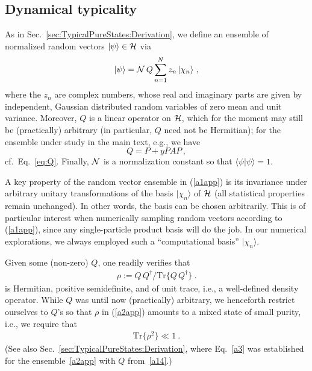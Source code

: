 \documentclass[twocolumn,aps,prb,floatfix,superscriptaddress]{revtex4-2}
\newcommand{\<}{\left\langle}	%
\renewcommand{\>}{\right\rangle}	%
\newcommand{\pu}{\tr\{\rho^2\}}
\newcommand{\tr}{\mbox{Tr}}
\newcommand{\hr}{{\cal H}}
\begin{document}
\subsection{Dynamical typicality}
\label{app111}

As 
in
Sec.~\ref{sec:TypicalPureStates:Derivation},
we define an ensemble of normalized 
random vectors $|\psi\rangle\in\hr$ via
\begin{eqnarray}
|\psi\rangle=
{\cal{N}}\, Q \sum_{n=1}^N z_n \, |\chi_n\rangle
\ ,
\label{a1app}
\end{eqnarray}
where the $z_n$ are complex numbers,
whose real and imaginary parts are 
given by independent, Gaussian distributed 
random variables of zero mean and 
unit variance.
Moreover, $Q$ is a linear operator on $\hr$,
which for the moment may still be 
(practically) arbitrary
(in particular, $Q$ need not be Hermitian);
for the ensemble under study in the main text,
e.g.,
we have
\begin{equation}
\label{a14}
	Q = P + y P A P \,,
\end{equation}
cf.\ Eq.~\eqref{eq:Q}.
Finally, ${\cal{N}}$ is a normalization 
constant so that 
$\langle\psi|\psi\rangle =1$.

A key property of the random vector ensemble 
in (\ref{a1app}) is its invariance under arbitrary 
unitary transformations of the basis 
$|\chi_n\rangle$ of $\hr$
(all statistical properties remain unchanged).
In other words, the basis can be chosen arbitrarily.
This is of particular interest when numerically
sampling random vectors according to (\ref{a1app}),
since any single-particle product basis 
will do the job.
In our numerical explorations, we always employed
such a ``computational basis'' $|\chi_n\rangle$.

Given some (non-zero) $Q$, one readily 
verifies that
\begin{eqnarray}
\rho:=Q\,Q^\dagger/\tr\{Q\,Q^\dagger\}
\ .
\label{a2app}
\end{eqnarray}
is Hermitian, positive semidefinite, and of unit 
trace, i.e., a well-defined density operator.
While $Q$ was until now (practically) 
arbitrary, we henceforth restrict 
ourselves to $Q$'s so
that $\rho$ in (\ref{a2app}) amounts to a mixed 
state of small purity, i.e., we require that
\begin{eqnarray}
\pu \ll 1
\ .
\label{a3}
\end{eqnarray}
(See also
Sec.~\ref{sec:TypicalPureStates:Derivation}, where 
Eq.~\eqref{a3} was established for the ensemble~\eqref{a2app} 
with $Q$ from~\eqref{a14}.)
\end{document}
